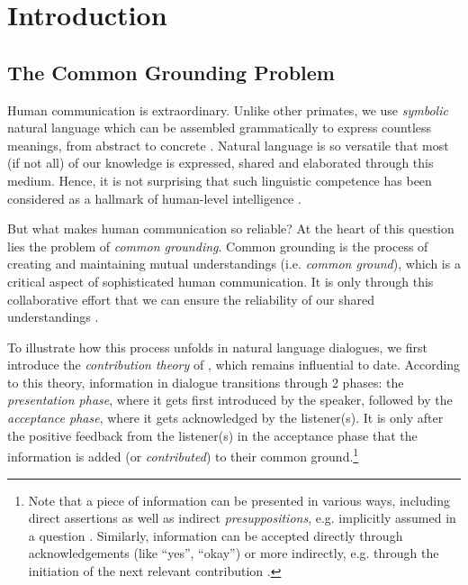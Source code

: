 \graphicspath{{01_introduction/figures/}} %

\chapter{Introduction}
\label{01_chp:introduction}

\section{The Common Grounding Problem}
\label{01_sec:common_grounding_problem}

Human communication is extraordinary. Unlike other primates, we use \textit{symbolic} natural language which can be assembled grammatically to express countless meanings, from abstract to concrete \citep{tomasello2009constructing}. Natural language is so versatile that most (if not all) of our knowledge is expressed, shared and elaborated through this medium. Hence, it is not surprising that such linguistic competence has been considered as a hallmark of human-level intelligence \citep{turing1950computing}.

But what makes human communication so reliable? At the heart of this question lies the problem of \textit{common grounding}. Common grounding is the process of creating and maintaining mutual understandings (i.e. \textit{common ground}), which is a critical aspect of sophisticated human communication. It is only through this collaborative effort that we can ensure the reliability of our shared understandings \citep{clark1996using}.

To illustrate how this process unfolds in natural language dialogues, we first introduce the \textit{contribution theory} of \citet{clark1989contributing}, which remains influential to date. According to this theory, information in dialogue transitions through 2 phases: the \textit{presentation phase}, where it gets first introduced by the speaker, followed by the \textit{acceptance phase}, where it gets acknowledged by the listener(s). It is only after the positive feedback from the listener(s) in the acceptance phase that the information is added (or \textit{contributed}) to their common ground.\footnote{Note that a piece of information can be presented in various ways, including direct assertions as well as indirect \textit{presuppositions}, e.g. implicitly assumed in a question \citep{stalnaker1978assertion}. Similarly, information can be accepted directly through acknowledgements (like ``yes'', ``okay'') or more indirectly, e.g. through the initiation of the next relevant contribution \citep{cho-may-2020-grounding}.}

